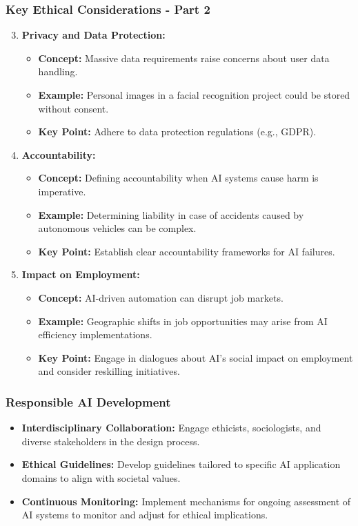 \documentclass[aspectratio=169]{beamer}
\begin{document}
\begin{frame}[fragile]
    \frametitle{Key Ethical Considerations - Part 2}
    \begin{enumerate}
        \setcounter{enumi}{2} %
        \item \textbf{Privacy and Data Protection:}
        \begin{itemize}
            \item \textbf{Concept:} Massive data requirements raise concerns about user data handling.
            \item \textbf{Example:} Personal images in a facial recognition project could be stored without consent.
            \item \textbf{Key Point:} Adhere to data protection regulations (e.g., GDPR).
        \end{itemize}
        
        \item \textbf{Accountability:}
        \begin{itemize}
            \item \textbf{Concept:} Defining accountability when AI systems cause harm is imperative.
            \item \textbf{Example:} Determining liability in case of accidents caused by autonomous vehicles can be complex.
            \item \textbf{Key Point:} Establish clear accountability frameworks for AI failures.
        \end{itemize}
        
        \item \textbf{Impact on Employment:}
        \begin{itemize}
            \item \textbf{Concept:} AI-driven automation can disrupt job markets.
            \item \textbf{Example:} Geographic shifts in job opportunities may arise from AI efficiency implementations.
            \item \textbf{Key Point:} Engage in dialogues about AI's social impact on employment and consider reskilling initiatives.
        \end{itemize}
    \end{enumerate}
\end{frame}

\begin{frame}[fragile]
    \frametitle{Responsible AI Development}
    \begin{itemize}
        \item \textbf{Interdisciplinary Collaboration:} Engage ethicists, sociologists, and diverse stakeholders in the design process.
        \item \textbf{Ethical Guidelines:} Develop guidelines tailored to specific AI application domains to align with societal values.
        \item \textbf{Continuous Monitoring:} Implement mechanisms for ongoing assessment of AI systems to monitor and adjust for ethical implications.
    \end{itemize}
\end{frame}
\end{document}
